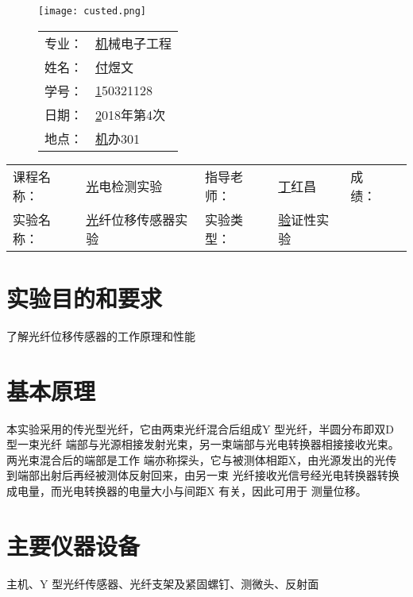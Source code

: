 \documentclass{zjureport}
\makeatletter
\newcommand\dlmu[2][4cm]{\hskip1pt\underline{\hb@xt@ #1{\hss#2\hss}}\hskip3pt}
\newcommand{\major}{机械电子工程}
\newcommand{\name}{付煜文}
\newcommand{\stuid}{150321128}
\newcommand{\newdate}{2018年第4次}
\newcommand{\loc}{机办301}
\newcommand{\course}{光电检测实验}
\newcommand{\tutor}{丁红昌}
\newcommand{\newtitle}{光纤位移传感器实验}
\newcommand{\exptype}{验证性实验}
\makeatother
\begin{document}
		\thispagestyle{plain}         %
	\begin{figure}[h]
		\begin{minipage}{0.6\linewidth}
			\centerline{\texttt{[image: custed.png]}}
		\end{minipage}
		\hfill
		\begin{minipage}{0.4\linewidth}
			\raggedleft
			\begin{tabular*}{.8\linewidth}{ll}
				专业： & \underline\major   \\
				姓名： & \underline\name    \\
				学号： & \underline\stuid   \\
				日期： & \underline\newdate \\
				地点： & \underline\loc
			\end{tabular*}
		\end{minipage}
	\end{figure}
	
	\begin{table}[!htbp]
		\centering
		\begin{tabular*}{\linewidth}{llllll}
			课程名称： & \underline\course   & 指导老师： & \underline\tutor   & 成绩：       &  \dlmu[1.5cm]{} \\
			实验名称： & \underline\newtitle & 实验类型： & \underline\exptype 
		\end{tabular*}
	\end{table}


\section{实验目的和要求}
	{了解光纤位移传感器的工作原理和性能}
\section{基本原理}
	{
		本实验采用的传光型光纤，它由两束光纤混合后组成Y 型光纤，半圆分布即双D 型一束光纤
		端部与光源相接发射光束，另一束端部与光电转换器相接接收光束。两光束混合后的端部是工作
		端亦称探头，它与被测体相距X，由光源发出的光传到端部出射后再经被测体反射回来，由另一束
		光纤接收光信号经光电转换器转换成电量，而光电转换器的电量大小与间距X 有关，因此可用于
		测量位移。}
\section{主要仪器设备}
  {主机、Y 型光纤传感器、光纤支架及紧固螺钉、测微头、反射面}
\end{document}
